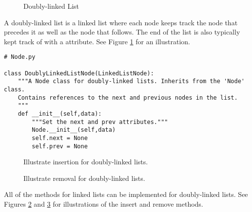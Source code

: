 \begin{figure}
\centering
{}
\caption{Doubly-linked List}
\label{fig:doubly_linked}
\end{figure}

A doubly-linked list is a linked list where each node keeps track the node that precedes it as well as the node that follows.
The end of the list is also typically kept track of with a  attribute.
See Figure \ref{fig:doubly_linked} for an illustration.


\begin{lstlisting}
# Node.py

class DoublyLinkedListNode(LinkedListNode):
	"""A Node class for doubly-linked lists. Inherits from the 'Node' class.
	Contains references to the next and previous nodes in the list.
	"""
	def __init__(self,data):
		"""Set the next and prev attributes."""
		Node.__init__(self,data)
		self.next = None
		self.prev = None
\end{lstlisting}

\begin{figure}
\centering
\caption{Illustrate insertion for doubly-linked lists.}
\label{fig:d_insertion}
\end{figure}

\begin{figure}
\centering
\caption{Illustrate removal for doubly-linked lists.}
\label{fig:d_removal}
\end{figure}


All of the methods for linked lists can be implemented for doubly-linked lists.
See Figures \ref{fig:d_insertion} and \ref{fig:d_removal} for illustrations of the insert and remove methods.

